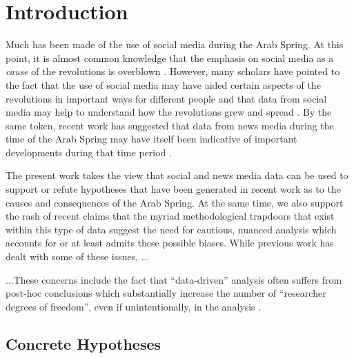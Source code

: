 \section{Introduction}

Much has been made of the use of social media during the Arab Spring. At this point, it is almost common knowledge that the emphasis on social media as a \emph{cause} of the revolutions is overblown \citep{bruns_arab_2013,goldstone_bringing_2013}. However, many scholars have pointed to the fact that the use of social media may have aided certain aspects of the revolutions in important ways for different people  \citep{galle_who_2013,starbird_how_2012,papacharissi_affective_2012} and that data from social media may help to understand how the revolutions grew and spread \citep{lotan_revolutions_2011,bruns_arab_2013}. By the same token, recent work has suggested that data from news media during the time of the Arab Spring may have itself been indicative of important developments during that time period \citep{joseph_arab_2014,pfeffer_rapid_2012}.

The present work takes the view that social and news media data can be used to support or refute hypotheses that have been generated in recent work as to the causes and consequences of the Arab Spring. At the same time, we also support the rash of recent claims that the myriad methodological trapdoors that exist within this type of data suggest the need for cautious, nuanced analysis which accounts for or at least admits these possible biases\cite{tufekci_big_2014,ruths_social_2014,joseph_approach_2014,morstatter_is_2013}. While previous work has dealt with some of these issues, ...

	...These concerns include the fact that ``data-driven'' analysis often suffers from post-hoc conclusions which substantially increase the number of ``researcher degrees of freedom'', even if unintentionally, in the analysis \cite{}. 

\subsection{Concrete Hypotheses}

